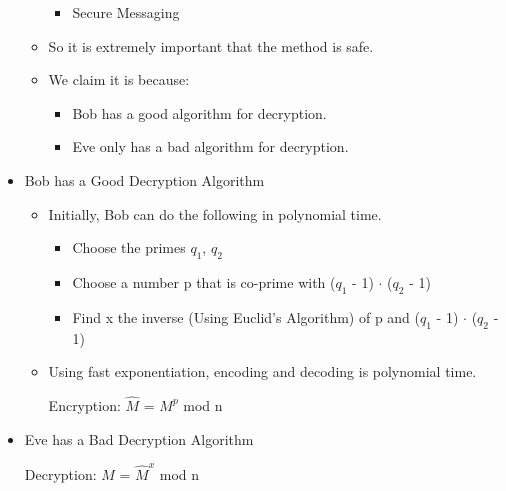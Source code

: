 \documentclass[12pt]{article}
\begin{document}
\begin{itemize}
\begin{itemize}
\begin{itemize}
		\item Secure Messaging
		\end{itemize}
	\item So it is extremely important that the method is safe.
	\item We claim it is because:
		\begin{itemize}
		\item Bob has a good  algorithm for decryption.
		\item Eve only has a bad algorithm for decryption.
		\end{itemize}
	\end{itemize}
\item Bob has a Good Decryption Algorithm
	\begin{itemize}
	\item Initially, Bob can do the following in polynomial time.
		\begin{itemize}
		\item Choose the primes $q_1$, $q_2$ 
		\item Choose a number p that is co-prime with ($q_{1}$ - 1) $\cdot$ 	($q_{2}$ - 1)
		\item Find x the inverse (Using Euclid's Algorithm) of p and ($q_{1}$ - 1) $\cdot$ ($q_{2}$ 			- 1)
		\end{itemize}
	\item Using fast exponentiation, encoding and decoding is polynomial time.
	
	\hspace*{\fill}Encryption: $\hat{M}$ = $M^p$ mod n\hspace*{\fill}
		
	\end{itemize}
\item Eve has a Bad Decryption Algorithm

	\hspace*{\fill}Decryption: $M$ = $\hat{M}^x$ mod n\hspace*{\fill}
		

\end{itemize}
\end{document}
